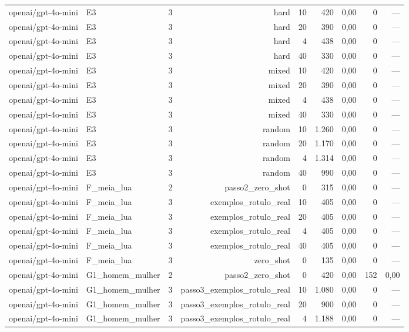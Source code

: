 \begin{table}[htbp]
\begin{tabular}{lllrrrrrr}
openai/gpt-4o-mini & E3 & 3 & hard & 10 & 420 & 0,00 & 0 & — \\
openai/gpt-4o-mini & E3 & 3 & hard & 20 & 390 & 0,00 & 0 & — \\
openai/gpt-4o-mini & E3 & 3 & hard & 4 & 438 & 0,00 & 0 & — \\
openai/gpt-4o-mini & E3 & 3 & hard & 40 & 330 & 0,00 & 0 & — \\
openai/gpt-4o-mini & E3 & 3 & mixed & 10 & 420 & 0,00 & 0 & — \\
openai/gpt-4o-mini & E3 & 3 & mixed & 20 & 390 & 0,00 & 0 & — \\
openai/gpt-4o-mini & E3 & 3 & mixed & 4 & 438 & 0,00 & 0 & — \\
openai/gpt-4o-mini & E3 & 3 & mixed & 40 & 330 & 0,00 & 0 & — \\
openai/gpt-4o-mini & E3 & 3 & random & 10 & 1.260 & 0,00 & 0 & — \\
openai/gpt-4o-mini & E3 & 3 & random & 20 & 1.170 & 0,00 & 0 & — \\
openai/gpt-4o-mini & E3 & 3 & random & 4 & 1.314 & 0,00 & 0 & — \\
openai/gpt-4o-mini & E3 & 3 & random & 40 & 990 & 0,00 & 0 & — \\
openai/gpt-4o-mini & F\_meia\_lua & 2 & passo2\_zero\_shot & 0 & 315 & 0,00 & 0 & — \\
openai/gpt-4o-mini & F\_meia\_lua & 3 & exemplos\_rotulo\_real & 10 & 405 & 0,00 & 0 & — \\
openai/gpt-4o-mini & F\_meia\_lua & 3 & exemplos\_rotulo\_real & 20 & 405 & 0,00 & 0 & — \\
openai/gpt-4o-mini & F\_meia\_lua & 3 & exemplos\_rotulo\_real & 4 & 405 & 0,00 & 0 & — \\
openai/gpt-4o-mini & F\_meia\_lua & 3 & exemplos\_rotulo\_real & 40 & 405 & 0,00 & 0 & — \\
openai/gpt-4o-mini & F\_meia\_lua & 3 & zero\_shot & 0 & 135 & 0,00 & 0 & — \\
openai/gpt-4o-mini & G1\_homem\_mulher & 2 & passo2\_zero\_shot & 0 & 420 & 0,00 & 152 & 0,00 \\
openai/gpt-4o-mini & G1\_homem\_mulher & 3 & passo3\_exemplos\_rotulo\_real & 10 & 1.080 & 0,00 & 0 & — \\
openai/gpt-4o-mini & G1\_homem\_mulher & 3 & passo3\_exemplos\_rotulo\_real & 20 & 900 & 0,00 & 0 & — \\
openai/gpt-4o-mini & G1\_homem\_mulher & 3 & passo3\_exemplos\_rotulo\_real & 4 & 1.188 & 0,00 & 0 & — \\

\end{tabular}
\end{table}
